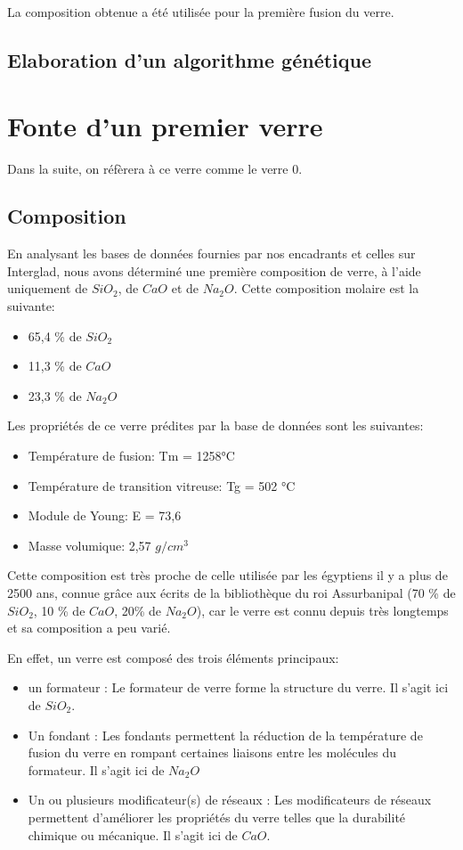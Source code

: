 \documentclass{article}
\begin{document}
La composition obtenue a été utilisée pour la première fusion du verre.

\subsection{Elaboration d'un algorithme génétique}

\section{Fonte d'un premier verre}
Dans la suite, on réfèrera à ce verre comme le verre 0.
\subsection{Composition}

En analysant les bases de données fournies par nos encadrants et celles sur Interglad, nous avons déterminé une première composition de verre, à l'aide uniquement de $SiO_2$, de $CaO$ et de $Na_2O$. Cette composition molaire est la suivante:

\begin{itemize}
    \item 65,4 \% de $SiO_2$
    \item 11,3 \% de $CaO$
    \item 23,3 \% de $Na_2O$
\end{itemize}

Les propriétés de ce verre prédites par la base de données sont les suivantes:
\begin{itemize}
    \item Température de fusion: Tm = 1258°C
    \item Température de transition vitreuse: Tg = 502 °C 
    \item Module de Young: E = 73,6
    \item Masse volumique: 2,57 $g/cm^{3}$ \\
\end{itemize}

Cette composition est très proche de celle utilisée par les égyptiens il y a plus de 2500 ans, connue grâce aux écrits de la bibliothèque du roi Assurbanipal (70 \% de $SiO_2$, 10 \% de $CaO$, 20\% de $Na_2O$), car le verre est connu depuis très longtemps et sa composition a peu varié. 

En effet, un verre est composé des trois éléments principaux:
\begin{itemize}
    \item un formateur : Le formateur de verre forme la structure du verre. Il s'agit ici de $SiO_2$.
    \item Un fondant : Les fondants permettent la réduction de la température de fusion du verre en rompant certaines liaisons entre les molécules du formateur. Il s'agit ici de $Na_2O$
    \item Un ou plusieurs modificateur(s) de réseaux : Les modificateurs de réseaux permettent d'améliorer les propriétés du verre telles que la durabilité chimique ou mécanique. Il s'agit ici de $CaO$.
\end{itemize}
\end{document}
